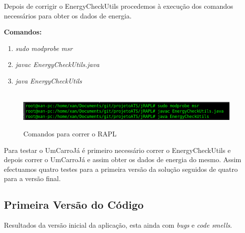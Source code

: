 Depois de corrigir o EnergyCheckUtils procedemos à execução dos comandos necessários para obter os dados de energia.\newline
 \par\textbf{Comandos:}

 \begin{enumerate}
 \item \textit{sudo modprobe msr}
 \item \textit{javac EnergyCheckUtils.java} 
 \item \textit{java EnergyCheckUtils}
\end{enumerate}


\begin{figure}[H]
    \hbox{\hspace{-8em} \includegraphics[width=1.5\textwidth]{images/rapl_run.png}}
    \label{fig51}
    \caption{Comandos para correr o RAPL}
\end{figure}

Para testar o UmCarroJá é primeiro necessário correr o EnergyCheckUtils e depois correr o UmCarroJá e assim obter os dados de energia do mesmo. Assim efectuamos quatro testes para a primeira versão da solução seguidos de quatro para a versão final.



\subsection{Primeira Versão do Código}
Resultados da versão inicial da aplicação, esta ainda com \textit{bugs} e \textit{code smells}.

